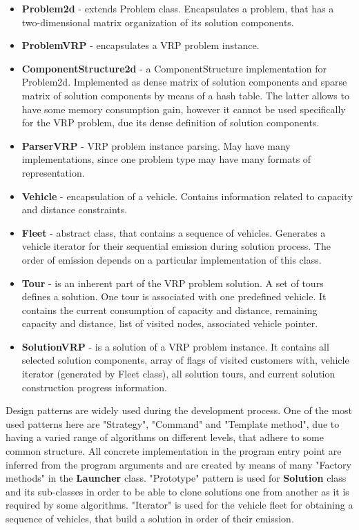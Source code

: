 \documentclass[12pt,a4paper,oneside]{book}
\begin{document}
\begin{itemize}
\item \textbf{Problem2d} - extends Problem class. Encapsulates a problem, that has a two-dimensional matrix organization of its solution components.

\item \textbf{ProblemVRP} - encapsulates a VRP problem instance.

\item \textbf{ComponentStructure2d} - a ComponentStructure implementation for Problem2d. Implemented as dense matrix of solution components and sparse matrix of solution components by means of a hash table. The latter allows to have some memory consumption gain, however it cannot be used specifically for the VRP problem, due its dense definition of solution components.

\item \textbf{ParserVRP} - VRP problem instance parsing. May have many implementations, since one problem type may have many formats of representation.

\item \textbf{Vehicle} - encapsulation of a vehicle. Contains information related to capacity and distance constraints.

\item \textbf{Fleet} - abstract class, that contains a sequence of vehicles. Generates a vehicle iterator for their sequential emission during solution process. The order of emission depends on a particular implementation of this class.

\item \textbf{Tour} - is an inherent part of the VRP problem solution. A set of tours defines a solution. One tour is associated with one predefined vehicle. It contains the current consumption of capacity and distance, remaining capacity and distance, list of visited nodes, associated vehicle pointer.

\item \textbf{SolutionVRP} - is a solution of a VRP problem instance. It contains all selected solution components, array of flags of visited customers with, vehicle iterator (generated by Fleet class), all solution tours, and current solution construction progress information.

\end{itemize}



Design patterns are widely used during the development process. One of the most used patterns here are "Strategy", "Command" and "Template method", due to having a varied range of algorithms on different levels, that adhere to some common structure. All concrete implementation in the program entry point are inferred from the program arguments and are created by means of many "Factory methods" in the \textbf{Launcher} class. "Prototype" pattern is used for \textbf{Solution} class and its sub-classes in order to be able to clone solutions one from another as it is required by some algorithms. "Iterator" is used for the vehicle fleet for obtaining a sequence of vehicles, that build a solution in order of their emission.
\end{document}
